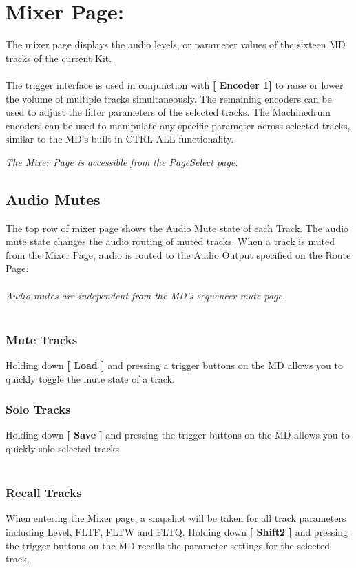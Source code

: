 \chapter{Mixer Page:}
The mixer page displays the audio levels, or parameter values of the sixteen MD tracks of the current Kit.
\\\\
The trigger interface is used in conjunction with \textbf{[ Encoder 1]} to raise or lower the volume of multiple tracks simultaneously. The remaining encoders can be used to adjust the filter parameters of the selected tracks. The Machinedrum encoders can be used to manipulate any specific parameter across selected tracks, similar to the MD's built in CTRL-ALL functionality.


\textit{The Mixer Page is accessible from the PageSelect page.}


\section{Audio Mutes}

The top row of mixer page shows the Audio Mute state of each Track. The audio mute state changes the audio routing of muted tracks. When a track is muted from the Mixer Page, audio is routed to the Audio Output specified on the Route Page.\\
\\
\textit{Audio mutes are independent from the MD's sequencer mute page.}
\\\\
\subsection{Mute Tracks}
Holding down \textbf{[ Load ]} and pressing a trigger buttons on the MD allows you to quickly toggle the mute state of a track.
\subsection{Solo Tracks}
Holding down \textbf{[ Save ]} and pressing the trigger buttons on the MD allows you to quickly solo selected tracks.\\\\
\subsection{Recall Tracks}
When entering the Mixer page, a snapshot will be taken for all track parameters including Level, FLTF, FLTW and FLTQ.
Holding down \textbf{[ Shift2 ]} and pressing the trigger buttons on the MD recalls the parameter settings for the selected track.
